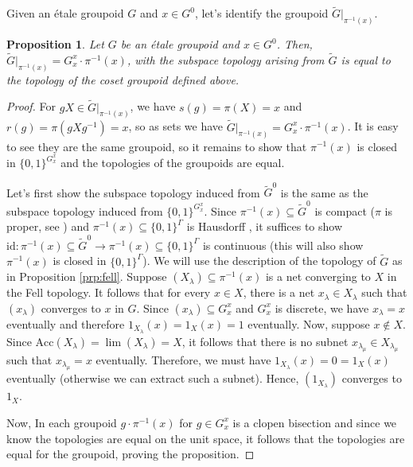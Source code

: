 \documentclass[a4paper, 12pt]{amsart}
\newtheorem{prp}[thm]{Proposition}
\theoremstyle{definition}
\theoremstyle{remark}
\numberwithin{equation}{section}
\begin{document}
 Given an \'etale groupoid $G$ and $x\in G^{0}$, let's identify the groupoid $\tilde{G}|_{\pi^{-1}(x)}$. 

\begin{prp}
\label{prp:rest=cosetgpd}
    Let $G$ be an \'etale groupoid and $x\in G^{0}$. Then, $\tilde{G}|_{\pi^{-1}(x)} = G_{x}^{x}\cdot \pi^{-1}(x)$, with the subspace topology arising from $\tilde{G}$ is equal to the topology of the coset groupoid defined above.
\end{prp}

\begin{proof}
    For $gX\in \tilde{G}|_{\pi^{-1}(x)}$, we have $s(g) = \pi(X) = x$ and $r(g) = \pi(gXg^{-1}) = x$, so as sets we have $\tilde{G}|_{\pi^{-1}(x)} = G^{x}_{x}\cdot \pi^{-1}(x)$. It is easy to see they are the same groupoid, so it remains to show that $\pi^{-1}(x)$ is closed in $\{0,1\}^{G^{x}_{x}}$ and the topologies of the groupoids are equal.
    
    Let's first show the subspace topology induced from $\tilde{G}^{0}$ is the same as the subspace topology induced from $\{0,1\}^{G^{x}_{x}}$. Since $\pi^{-1}(x)\subseteq \tilde{G}^{0}$ is compact ($\pi$ is proper, see \cite[Section~3]{BGHL25}) and $\pi^{-1}(x)\subseteq \{0,1\}^{\Gamma}$ is Hausdorff , it suffices to show $\text{id}:\pi^{-1}(x)\subseteq \tilde{G}^{0}\to \pi^{-1}(x)\subseteq \{0,1\}^{\Gamma}$ is continuous (this will also show $\pi^{-1}(x)$ is closed in $\{0,1\}^{\Gamma}$). We will use the description of the topology of $\tilde{G}$ as in Proposition \ref{prp:fell}. Suppose $(X_{\lambda})\subseteq \pi^{-1}(x)$ is a net converging to $X$ in the Fell topology. It follows that for every $x\in X$, there is a net $x_{\lambda}\in X_{\lambda}$ such that $(x_{\lambda})$ converges to $x$ in $G$. Since $(x_{\lambda})\subseteq G^{x}_{x}$ and $G^{x}_{x}$ is discrete, we have $x_{\lambda} = x$ eventually and therefore $1_{X_{\lambda}}(x) = 1_{X}(x) = 1$ eventually. Now, suppose $x\notin X$. Since $\text{Acc}(X_{\lambda}) = \lim(X_{\lambda}) = X$, it follows that there is no subnet $x_{\lambda_{\mu}}\in X_{\lambda_{\mu}}$ such that $x_{\lambda_{\mu}} = x$ eventually. Therefore, we must have $1_{X_{\lambda}}(x) = 0 = 1_{X}(x)$ eventually (otherwise we can extract such a subnet). Hence, $(1_{X_{\lambda}})$ converges to $1_{X}$.

    Now, In each groupoid $g\cdot \pi^{-1}(x)$ for $g\in G^{x}_{x}$ is a clopen bisection and since we know the topologies are equal on the unit space, it follows that the topologies are equal for the groupoid, proving the proposition.
\end{proof}
\end{document}
